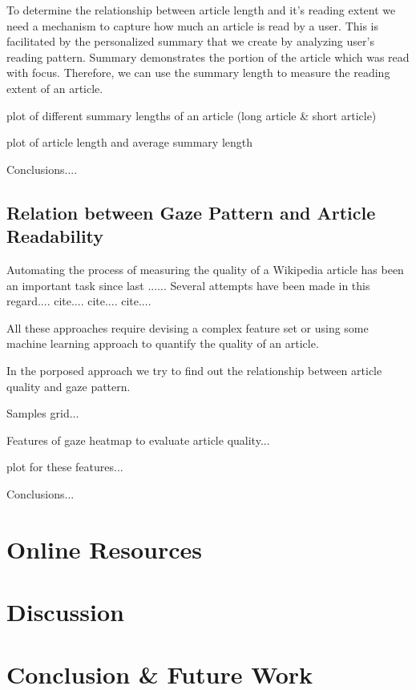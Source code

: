 \documentclass[12pt]{article}
\begin{document}
To determine the relationship between article length and it's reading extent
we need a mechanism to capture how much an article is read by a user. This is facilitated by the personalized summary that we create by analyzing user's reading pattern. Summary demonstrates the portion of the article which was read with focus. Therefore, we can use the summary length to measure the reading extent of an article.



plot of different summary lengths of an article (long article \& short article)

plot of article length and average summary length



Conclusions....

    
    
\subsection{Relation between Gaze Pattern and Article Readability}    
Automating the process of measuring the quality of a Wikipedia article has been an important task since last ...... Several attempts have been made in this regard....
cite....
cite....
cite....

All these approaches require devising a complex feature set or using some machine learning approach to quantify the quality of an article. 

In the porposed approach we try to find out the relationship between article quality and gaze pattern.

Samples grid...

Features of gaze heatmap to evaluate article quality...

plot for these features...

Conclusions...
    
\section{Online Resources}\label{sec:Resources}


\section{Discussion}\label{sec:Discussion}


\section{Conclusion \& Future Work}\label{sec:Conclusion}
\end{document}
